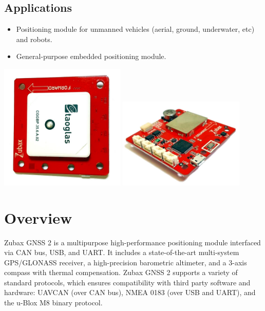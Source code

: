 \documentclass{zubaxdoc}
\begin{document}
\begin{titlepage}
\BeginRightColumn

\section*{Applications}

\begin{itemize}
	\item Positioning module for unmanned vehicles (aerial, ground, underwater, etc) and robots.
    \item General-purpose embedded positioning module.
\end{itemize}

\centering
\includegraphics[width=0.45\textwidth]{GNSS_top}
\includegraphics[width=0.45\textwidth]{GNSS_bottom}
\end{titlepage}

\tableofcontents
\clearpage
\listoffigures
\BeginRightColumn
\listoftables

\mainmatter

\chapter{Overview}

Zubax GNSS 2 is a multipurpose high-performance positioning module interfaced via CAN bus, USB, and UART.
It includes a state-of-the-art multi-system GPS/GLONASS receiver, a high-precision barometric altimeter, and a 3-axis compass with thermal compensation.
Zubax GNSS 2 supports a variety of standard protocols, which ensures compatibility with third party software and hardware: UAVCAN (over CAN bus), NMEA 0183 (over USB and UART), and the u-Blox M8 binary protocol.
\end{document}
